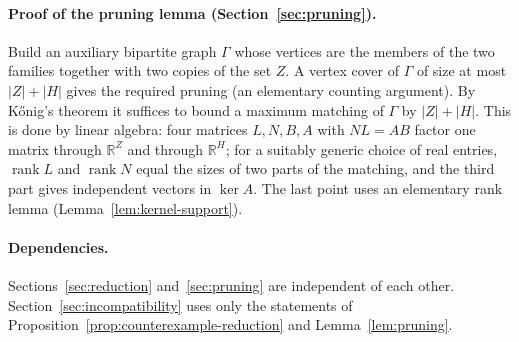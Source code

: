 \documentclass[11pt]{article}
\theoremstyle{remark}
\newcommand{\abs}[1]{\lvert #1\rvert}
\DeclareMathOperator{\rank}{rank}
\newcommand{\R}{\mathbb R}
\begin{document}
\paragraph{Proof of the pruning lemma (Section~\ref{sec:pruning}).}
Build an auxiliary bipartite graph $\Gamma$ whose vertices are the members
of the two families together with two copies of the set $Z$. A
vertex cover of $\Gamma$ of size at most $\abs Z+\abs H$ gives the required
pruning (an elementary counting argument). By K\H{o}nig's theorem it
suffices to bound a maximum matching of $\Gamma$ by $\abs Z+\abs H$. This is
done by linear algebra: four matrices $L,N,B,A$ with $NL=AB$ factor one
matrix through $\R^Z$ and through $\R^H$; for a suitably generic choice of
real entries, $\rank L$ and $\rank N$ equal the sizes of two parts of the
matching, and the third part gives independent vectors in $\ker A$.
The last point uses an elementary rank lemma
(Lemma~\ref{lem:kernel-support}).

\paragraph{Dependencies.}
\begin{center}
\end{center}
Sections~\ref{sec:reduction} and~\ref{sec:pruning} are independent of each
other. Section~\ref{sec:incompatibility} uses only the statements of
Proposition~\ref{prop:counterexample-reduction} and
Lemma~\ref{lem:pruning}.
\end{document}
